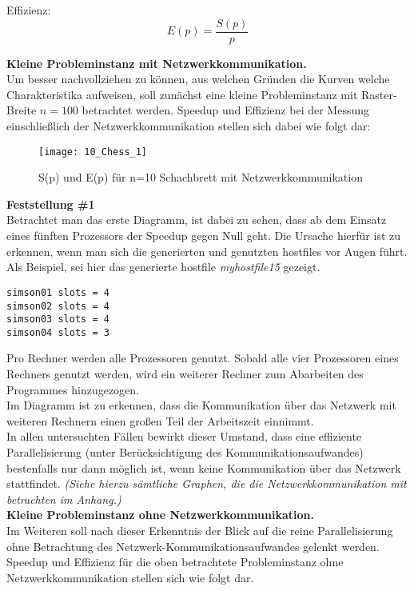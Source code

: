 \documentclass[
10pt, %
a4paper, %
oneside, %
headinclude,footinclude, %
BCOR5mm, %
]{scrartcl}
\begin{document}
Effizienz:
\begin{equation}
E(p)=\frac{S(p)}{p}
\end{equation}

\textbf{Kleine Probleminstanz mit Netzwerkkommunikation.}\\
Um besser nachvollziehen zu können, aus welchen Gründen die Kurven welche Charakteristika aufweisen, soll zunächst eine kleine Probleminstanz mit Raster-Breite \(n=100\) betrachtet werden. Speedup und Effizienz bei der Messung einschließlich der Netzwerkkommunikation stellen sich dabei wie folgt dar:\\

\begin{figure}[h]
	\centering 
	\texttt{[image: 10\_Chess\_1]} 
	\caption[S(p) und E(p) für n=10 Schachbrett mit Netzwerkkomm.]{S(p) und E(p) für n=10 Schachbrett mit Netzwerkkommunikation}
\end{figure}

\textbf{Feststellung \#1}\\
Betrachtet man das erste Diagramm, ist dabei zu sehen, dass ab dem Einsatz eines fünften Prozessors der Speedup gegen Null geht. Die Ursache hierfür ist zu erkennen, wenn man sich die generierten und genutzten hostfiles vor Augen führt. Als Beispiel, sei hier das generierte hostfile \textit{myhostfile15} gezeigt.\\

\begin{lstlisting}
simson01 slots = 4
simson02 slots = 4
simson03 slots = 4
simson04 slots = 3
\end{lstlisting}

Pro Rechner werden alle Prozessoren genutzt. Sobald alle vier Prozessoren eines Rechners genutzt werden, wird ein weiterer Rechner zum Abarbeiten des Programmes hinzugezogen.\\
Im Diagramm ist zu erkennen, dass die Kommunikation über das Netzwerk mit weiteren Rechnern einen großen Teil der Arbeitszeit einnimmt.\\
In allen untersuchten Fällen bewirkt dieser Umstand, dass eine effiziente Parallelisierung (unter Berücksichtigung des Kommunikationsaufwandes) bestenfalls nur dann möglich ist, wenn keine Kommunikation über das Netzwerk stattfindet. \textit{(Siehe hierzu sämtliche Graphen, die die Netzwerkkommunikation mit betrachten im Anhang.)}\\

\textbf{Kleine Probleminstanz ohne Netzwerkkommunikation.}\\
Im Weiteren soll nach dieser Erkenntnis der Blick auf die reine Parallelisierung ohne Betrachtung des Netzwerk-Kommunikationsaufwandes gelenkt werden. Speedup und Effizienz für die oben betrachtete Probleminstanz ohne Netzwerkkommunikation stellen sich wie folgt dar.\\
\end{document}
